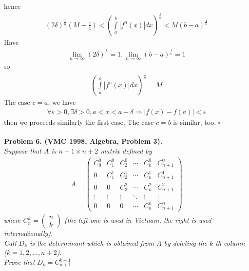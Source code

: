 \documentclass{article}
\numberwithin{equation}{section}
\begin{document}
hence 
\begin{align}
{\left( {2\delta } \right)^{\frac{1}{n}}}\left( {M - \frac{\varepsilon }{4}} \right) < {\left( {\int\limits_a^b {\left| {{f^n}\left( x \right)} \right|} dx} \right)^{\frac{1}{n}}} < M{\left( {b - a} \right)^{\frac{1}{n}}}
\end{align}
Have 
\begin{align}
\mathop {\lim }\limits_{n \to \infty } {\left( {2\delta } \right)^{\frac{1}{n}}} = 1,\mathop {\lim }\limits_{n \to \infty } {\left( {b - a} \right)^{\frac{1}{n}}} = 1
\end{align}
so 
\begin{align}
{\left( {\int\limits_a^b {\left| {{f^n}\left( x \right)} \right|} dx} \right)^{\frac{1}{n}}} = M
\end{align}
The case $c=a$, we have 
\begin{align}
\forall \varepsilon  > 0,\exists \delta  > 0,a < x < a + \delta  \Rightarrow \left| {f\left( x \right) - f\left( a \right)} \right| < \varepsilon
\end{align}
then we proceeds similarly the first case. The case $c=b$ is similar, too. \hfill $\square$\\
\\
\textbf{Problem 6. (VMC 1998, Algebra, Problem 3).}\\
\textit{Suppose that $A$ is $n+1 \times n+2$ matrix defined by
\begin{align}
A = \left( {\begin{array}{*{20}{c}}
{C_0^0}&{C_1^0}&{C_2^0}& \cdots &{C_n^0}&{C_{n + 1}^0}\\
0&{C_1^1}&{C_2^1}& \cdots &{C_n^1}&{C_{n + 1}^1}\\
0&0&{C_2^2}& \cdots &{C_n^2}&{C_{n + 1}^2}\\
 \vdots & \vdots & \vdots & \ddots & \vdots & \vdots \\
0&0&0& \cdots &{C_n^n}&{C_{n + 1}^n}
\end{array}} \right)
\end{align}
where $C_n^k = \left( {\begin{array}{*{20}{c}}
n\\
k
\end{array}} \right)$ (the left one is used in Vietnam, the right is used internationally).\\
Call $D_k$ is the determinant which is obtained from $A$ by deleting the $k$-th column ($k=1,2,...,n+2$).\\ Prove that ${D_k} = C_{n + 1}^{k - 1}$}\\
\end{document}
